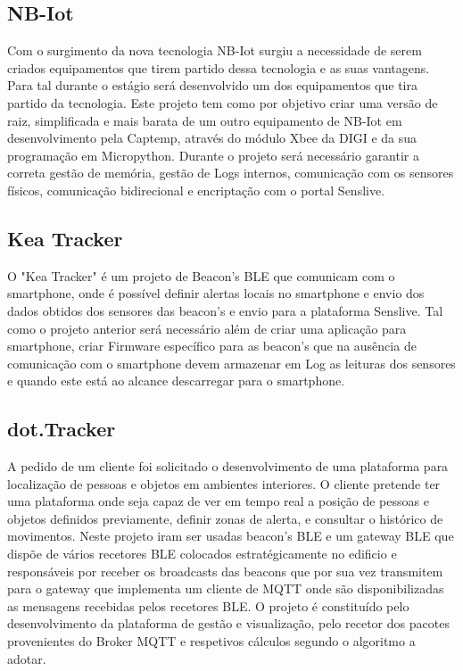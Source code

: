 \subsection{NB-Iot}
Com o surgimento da nova tecnologia NB-Iot surgiu a necessidade de serem criados equipamentos que tirem partido dessa tecnologia e as suas vantagens. Para tal durante o estágio será desenvolvido um dos equipamentos que tira partido da tecnologia. Este projeto tem como por objetivo criar uma versão de raiz, simplificada e mais barata de um outro equipamento de NB-Iot em desenvolvimento pela Captemp, através do módulo Xbee da DIGI e da sua programação em Micropython. Durante o projeto será necessário garantir a correta gestão de memória, gestão de Logs internos, comunicação com os sensores físicos, comunicação bidirecional e encriptação com o portal Senslive.
\subsection{Kea Tracker}
O "Kea Tracker" é um projeto de Beacon’s BLE que comunicam com o smartphone, onde é possível definir alertas locais no smartphone e envio dos dados obtidos dos sensores das beacon’s e envio para a plataforma Senslive.
Tal como o projeto anterior será necessário além de criar uma aplicação para smartphone, criar Firmware específico para as beacon’s que na ausência de comunicação com o smartphone devem armazenar em Log as leituras dos sensores e quando este está ao alcance descarregar para o smartphone.
\subsection{dot.Tracker}
A pedido de um cliente foi solicitado o desenvolvimento de uma plataforma para localização de pessoas e objetos em ambientes interiores. O cliente pretende ter uma plataforma onde seja capaz de ver em tempo real a posição de pessoas e objetos definidos previamente, definir zonas de alerta, e consultar o histórico de movimentos. Neste projeto iram ser usadas beacon's BLE e um gateway BLE que dispõe de vários recetores BLE colocados estratégicamente no edificio e responsáveis por receber os broadcasts das beacons que por sua vez transmitem para o gateway que implementa um cliente de MQTT onde são disponibilizadas as mensagens recebidas pelos recetores BLE. O projeto é constituído pelo desenvolvimento da plataforma de gestão e visualização, pelo recetor dos pacotes provenientes do Broker MQTT e respetivos cálculos segundo o algoritmo a adotar.

